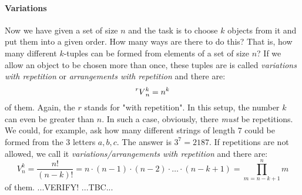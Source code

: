 

\paragraph{Variations}
Now we have given a set of size $n$ and the task is to choose $k$ objects from it and put them into a given order. How many ways are there to do this? That is, how many different $k$-tuples can be formed from elements of a set of size $n$? If we allow an object to be chosen more than once, these tuples are is called \emph{variations with repetition} or \emph{arrangements with repetition} and there are:
\begin{equation}
\prescript{r}{}{V}_n^k = n^k
\end{equation}
of them. Again, the $r$ stands for "with repetition". In this setup, the number $k$ can even be greater than $n$. In such a case, obviously, there \emph{must} be repetitions. We could, for example, ask how many different strings of length $7$ could be formed from the $3$ letters $a,b,c$. The answer is $3^7 = 2187$. If repetitions are not allowed, we call it \emph{variations/arrangements with repetition} and there are:
\begin{equation}
V_n^k = \frac{n!}{(n-k)!} 
      = n \cdot (n-1) \cdot (n-2) \cdot \ldots \cdot (n-k+1) 
      = \prod_{m=n-k+1}^{n} m
\end{equation}
of them. ...VERIFY! ...TBC...




% 


